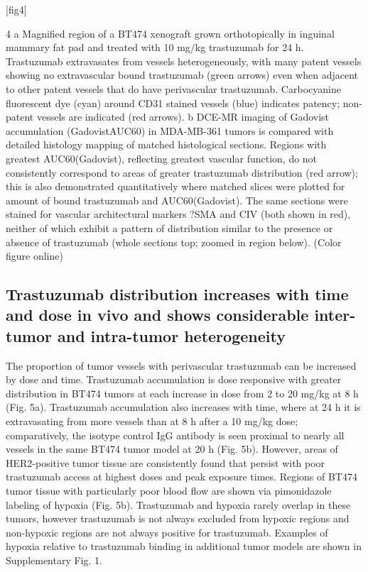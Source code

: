 [fig4]

4
a Magnified region of a BT474 xenograft grown orthotopically in inguinal mammary fat pad and treated with 10 mg/kg trastuzumab for 24 h.
Trastuzumab extravasates from vessels heterogeneously, with many patent vessels showing no extravascular bound trastuzumab (green arrows) even when adjacent to other patent vessels that do have perivascular trastuzumab.
Carbocyanine fluorescent dye (cyan) around CD31 stained vessels (blue) indicates patency; non-patent vessels are indicated (red arrows).
b DCE-MR imaging of Gadovist accumulation (GadovistAUC60) in MDA-MB-361 tumors is compared with detailed histology mapping of matched histological sections.
Regions with greatest AUC60(Gadovist), reflecting greatest vascular function, do not consistently correspond to areas of greater trastuzumab distribution (red arrow); this is also demonstrated quantitatively where matched slices were plotted for amount of bound trastuzumab and AUC60(Gadovist).
The same sections were stained for vascular architectural markers ?SMA and CIV (both shown in red), neither of which exhibit a pattern of distribution similar to the presence or absence of trastuzumab (whole sections top; zoomed in region below).
(Color figure online)


\subsection{Trastuzumab distribution increases with time and dose in vivo and shows considerable inter-tumor and intra-tumor heterogeneity}

The proportion of tumor vessels with perivascular trastuzumab can be increased by dose and time.
Trastuzumab accumulation is dose responsive with greater distribution in BT474 tumors at each increase in dose from 2 to 20 mg/kg at 8 h (Fig.
5a).
Trastuzumab accumulation also increases with time, where at 24 h it is extravasating from more vessels than at 8 h after a 10 mg/kg dose; comparatively, the isotype control IgG antibody is seen proximal to nearly all vessels in the same BT474 tumor model at 20 h (Fig.
5b).
However, areas of HER2-positive tumor tissue are consistently found that persist with poor trastuzumab access at highest doses and peak exposure times.
Regions of BT474 tumor tissue with particularly poor blood flow are shown via pimonidazole labeling of hypoxia (Fig.
5b).
Trastuzumab and hypoxia rarely overlap in these tumors, however trastuzumab is not always excluded from hypoxic regions and non-hypoxic regions are not always positive for trastuzumab.
Examples of hypoxia relative to trastuzumab binding in additional tumor models are shown in Supplementary Fig.
1.

